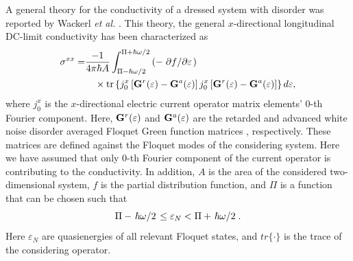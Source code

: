 \documentclass[
 reprint,
 amsmath,amssymb,
 aps,
 prb,
]{revtex4-2}
\begin{document}
A general theory for the conductivity of a dressed system with disorder was reported by Wackerl \textit{et al.} \cite{wackerl20,wackerlthesis20}. This theory, the general $x$-directional longitudinal DC-limit conductivity has been characterized as
\begin{equation} \label{eq:22}
  \begin{aligned}
    \sigma^{xx} = &
    \frac{-1}{4\pi\hbar A}
    \int_{\Pi-\hbar\omega/2}^{\Pi+ \hbar\omega/2}
    \left(
    -\pdv*{f}{\varepsilon }\right) \\
    &  \quad\times
    \tr
    \left\{
    {j}^x_0
    \left[
    \vb{G}^{r} (\varepsilon) - \vb{G}^{a} (\varepsilon)
    \right]
    {j}^x_0
    \left[
    \vb{G}^{r} (\varepsilon) - \vb{G}^{a} (\varepsilon)
    \right]
    \right\} d\varepsilon,
  \end{aligned}
\end{equation}
where $j^x_0$ is the $x$-directional electric current operator matrix elements' $0$-th Fourier component. Here, $\vb{G}^{r}(\varepsilon)$ and $\vb{G}^{a} (\varepsilon)$ are the retarded and advanced white noise disorder averaged Floquet Green function matrices \cite{wackerl20,wackerlthesis20}, respectively. These matrices are defined against the Floquet modes of the considering system. Here we have assumed that only $0$-th Fourier component of the current operator is contributing to the conductivity. In addition, $A$ is the area of the considered two-dimensional system, $f$ is the partial distribution function, and $\Pi$ is a function that can be chosen such that
\begin{equation} \label{eq:23}
    \Pi- \flatfrac{\hbar \omega}{2}
    \leq \varepsilon_N
    <
    \Pi + \flatfrac{\hbar \omega}{2}.
\end{equation}
Here $ \varepsilon_N$ are quasienergies of all relevant Floquet states, and $tr\{\cdot\}$ is the trace of the considering operator.
\end{document}
